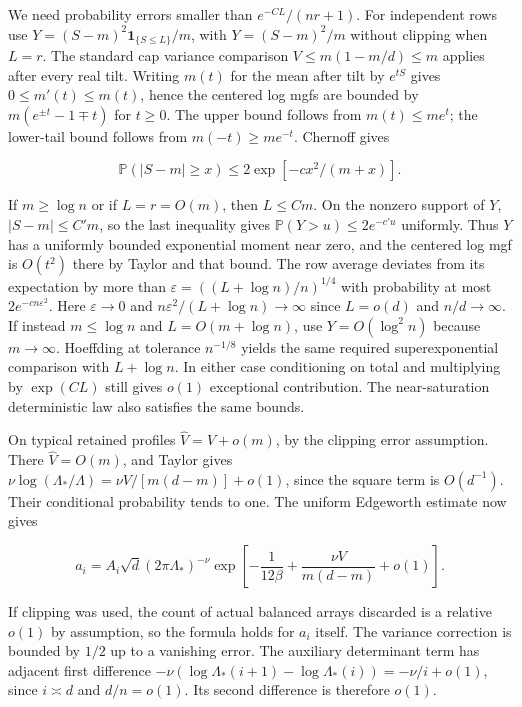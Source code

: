 We need probability errors smaller than $e^{-CL}/(nr+1)$. For independent rows use $Y=(S-m)^2\mathbf1_{\{S\le L\}}/m$, with $Y=(S-m)^2/m$ without clipping when $L=r$. The standard cap variance comparison $V\le m(1-m/d)\le m$ applies after every real tilt. Writing $m(t)$ for the mean after tilt by $e^{tS}$ gives $0\le m'(t)\le m(t)$, hence the centered log mgfs are bounded by $m(e^{\pm t}-1\mp t)$ for $t\ge0$. The upper bound follows from $m(t)\le m e^t$; the lower-tail bound follows from $m(-t)\ge m e^{-t}$. Chernoff gives

\begin{equation*}
\mathbb P(|S-m|\ge x)\le 2\exp[-c x^2/(m+x)].
\end{equation*}

If $m\ge\log n$ or if $L=r=O(m)$, then $L\le C m$. On the nonzero support of $Y$, $|S-m|\le C'm$, so the last inequality gives $\mathbb P(Y>u)\le2e^{-c' u}$ uniformly. Thus $Y$ has a uniformly bounded exponential moment near zero, and the centered log mgf is $O(t^2)$ there by Taylor and that bound. The row average deviates from its expectation by more than $\varepsilon=((L+\log n)/n)^{1/4}$ with probability at most $2e^{-c n\varepsilon^2}$. Here $\varepsilon\to0$ and $n\varepsilon^2/(L+\log n)\to\infty$ since $L=o(d)$ and $n/d\to\infty$. If instead $m\le\log n$ and $L=O(m+\log n)$, use $Y=O(\log^2 n)$ because $m\to\infty$. Hoeffding at tolerance $n^{-1/8}$ yields the same required superexponential comparison with $L+\log n$. In either case conditioning on total and multiplying by $\exp(CL)$ still gives $o(1)$ exceptional contribution. The near-saturation deterministic law also satisfies the same bounds.

On typical retained profiles $\widehat V=V+o(m)$, by the clipping error assumption. There $\widehat V=O(m)$, and Taylor gives $\nu\log(\Lambda_*/\Lambda)=\nu V/[m(d-m)]+o(1)$, since the square term is $O(d^{-1})$. Their conditional probability tends to one. The uniform Edgeworth estimate now gives

\begin{equation*}
a_i=A_i\sqrt d(2\pi\Lambda_*)^{-\nu}
  \exp\!\left[-\frac1{12\beta}+\frac{\nu V}{m(d-m)}+o(1)\right].
\end{equation*}

If clipping was used, the count of actual balanced arrays discarded is a relative $o(1)$ by assumption, so the formula holds for $a_i$ itself. The variance correction is bounded by $1/2$ up to a vanishing error. The auxiliary determinant term has adjacent first difference
$-\nu(\log\Lambda_*(i+1)-\log\Lambda_*(i))=-\nu/i+o(1)$, since $i\asymp d$ and $d/n=o(1)$. Its second difference is therefore $o(1)$.


